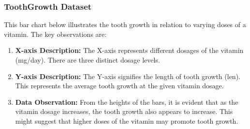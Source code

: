 \documentclass{article}\usepackage[]{graphicx}\usepackage[]{xcolor}
\begin{document}
\subsubsection{ToothGrowth Dataset}


This bar chart below illustrates the tooth growth in relation to varying doses of a vitamin. The key observations are:

\begin{enumerate}
    \item \textbf{X-axis Description:} The X-axis represents different dosages of the vitamin (mg/day). There are three distinct dosage levels.
    
    \item \textbf{Y-axis Description:} The Y-axis signifies the length of tooth growth (len). This represents the average tooth growth at the given vitamin dosage.
    \item \textbf{Data Observation:} From the heights of the bars, it is evident that as the vitamin dosage increases, the tooth growth also appears to increase. This might suggest that higher doses of the vitamin may promote tooth growth.
\end{enumerate}
\end{document}
